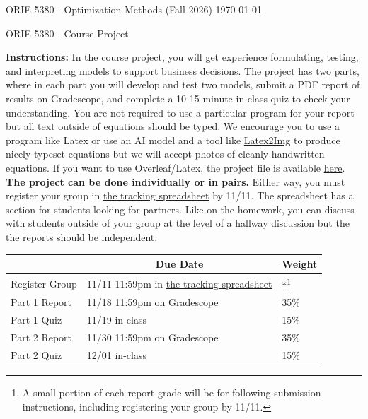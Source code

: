 \documentclass{article}
\begin{document}
\noindent ORIE 5380 - Optimization Methods (Fall 2026) \hfill \today

\vspace{1cm}
\begin{center}
\Large{ORIE 5380 - Course Project}
\end{center}
\vspace{0.5cm}

\textbf{Instructions:} In the course project, you will get experience formulating, testing, and interpreting models to support business decisions. The project has two parts, where in each part you will develop and test two models, submit a PDF report of results on Gradescope, and complete a 10-15 minute in-class quiz to check your understanding. You are not required to use a particular program for your report but all text outside of equations should be typed. We encourage you to use a program like Latex or use an AI model and a tool like \href{https://latex2image.joeraut.com/}{Latex2Img} to produce nicely typeset equations but we will accept photos of cleanly handwritten equations. If you want to use Overleaf/Latex, the project file is available \href{https://canvas.cornell.edu/courses/88614/files/folder/project}{here}.\\

\textbf{The project can be done individually or in pairs.} Either way, you must register your group in  \href{https://docs.google.com/spreadsheets/d/1Qzpdowc_uBHIe97B-gszYy7gAgAWgxaJapTZxUTM9T8/edit?usp=sharing}{the tracking spreadsheet} by 11/11. The spreadsheet has a section for students looking for partners. Like on the homework, you can discuss with students outside of your group at the level of a hallway discussion but the the reports should be independent.\\

\begin{minipage}{\textwidth}
\centering
\begin{tabular}{|l|l|l|}
\hline
    & \multicolumn{1}{c|}{\textbf{Due Date}} & \multicolumn{1}{c|}{\textbf{Weight}} \\ \hline
Register Group & 11/11 11:59pm in \href{https://docs.google.com/spreadsheets/d/1Qzpdowc_uBHIe97B-gszYy7gAgAWgxaJapTZxUTM9T8/edit?usp=sharing}{the tracking spreadsheet}     & *\footnote{A small portion of each report grade will be for following submission instructions, including registering your group by 11/11.} \\ \hline
Part 1 Report  & 11/18 11:59pm on Gradescope            & 35\%                                 \\ \hline
Part 1 Quiz    & 11/19 in-class                         & 15\%                                 \\ \hline
Part 2 Report & 11/30 11:59pm on Gradescope             & 35\%                                 \\ \hline
Part 2 Quiz   & 12/01 in-class                          & 15\%                                 \\ \hline
\end{tabular}
\end{minipage}
\end{document}

